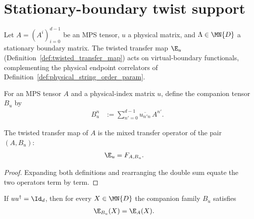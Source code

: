 \section{Stationary-boundary twist support}
\label{sec:app_symmetry_stationary_twists}

Let $A=(A^i)_{i=0}^{d-1}$ be an MPS tensor, $u$ a physical matrix, and
$\Lambda\in\MN{D}$ a stationary boundary matrix. The twisted transfer map
$\E_u$ (Definition~\ref{def:twisted_transfer_map}) acts on virtual-boundary
functionals, complementing the physical endpoint correlators of
Definition~\ref{def:physical_string_order_param}.

\begin{definition}\label{def:twisted_mixed_companion}
    \leanok
    For an MPS tensor $A$ and a physical-index matrix $u$, define the
    companion tensor $B_u$ by
    \begin{align}
        B_u^n
         & := \sum_{n'=0}^{d-1} \overline{u_{n'n}}\, A^{n'}.
        \label{eq:symmetry_companion_tensor}
    \end{align}
\end{definition}

\begin{lemma}%
    \label{lem:twisted_transfer_eq_mixed_transfer}
    \leanok
    The twisted transfer map of $A$ is the mixed transfer operator of the pair
    $(A,B_u)$:
    \begin{align}
        \E_u & = F_{A,B_u}.
        \label{eq:symmetry_twisted_mixed_transfer}
    \end{align}
\end{lemma}

\begin{proof}
    \leanok
    Expanding both definitions and rearranging the double sum equate the two
    operators term by term.
\end{proof}


\begin{lemma}
    \label{lem:transfer_map_twisted_companion}
    \leanok
    If $uu^\dagger=\Id_d$, then for every $X\in\MN{D}$ the companion family
    $B_u$ satisfies
    \begin{align}
        \E_{B_u}(X) & =\E_A(X).
        \notag
    \end{align}
\end{lemma}

